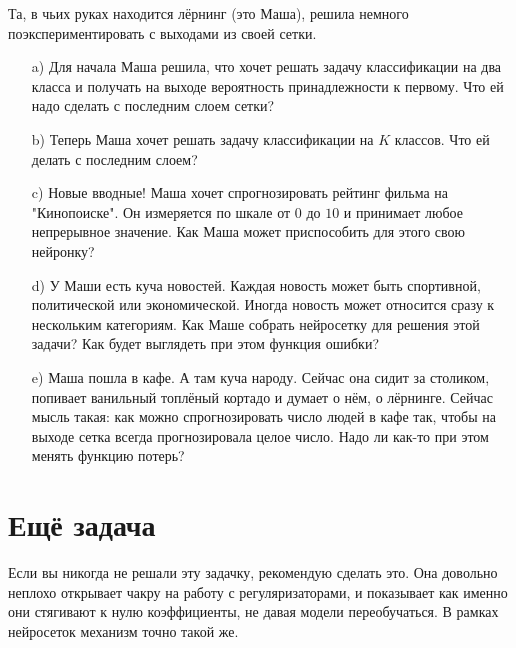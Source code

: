\documentclass[12pt, a4paper, oneside]{article}
\newcounter{problem}
\renewcommand{\theproblem}{\arabic{problem}}
\newcommand{\problemname}{Задача}
\newenvironment{problem}{
	\addtocounter{problem}{1}\noindent{ \color{myblue} \large\bfseries \problemname{} \theproblem \newline }
}{
	\par\bigskip
}
\begin{document}
\begin{problem}
	Та, в чьих руках находится лёрнинг (это Маша), решила немного поэкспериментировать с выходами из своей сетки. 
	\begin{itemize}
		\item[a)]  Для начала Маша решила, что хочет решать задачу классификации на два класса и получать на выходе вероятность принадлежности к первому. Что ей надо сделать с последним слоем сетки? 
		\item[b)]  Теперь Маша хочет решать задачу классификации на $K$ классов. Что ей делать с последним слоем? 
		\item[c)]  Новые вводные! Маша хочет спрогнозировать рейтинг фильма на "Кинопоиске". Он измеряется по шкале от $0$ до $10$ и принимает любое непрерывное значение. Как Маша может приспособить для этого свою нейронку? 
		\item[d)]  У Маши есть куча новостей. Каждая новость может быть спортивной, политической или экономической. Иногда новость может относится сразу к нескольким категориям. Как Маше собрать нейросетку для решения этой задачи?  Как будет выглядеть при этом функция ошибки? 
		\item[e)]  Маша пошла в кафе. А там куча народу. Сейчас она сидит за столиком, попивает ванильный топлёный кортадо и думает о нём, о лёрнинге.  Сейчас мысль такая: как можно спрогнозировать число людей в кафе так, чтобы на выходе сетка всегда прогнозировала целое число. Надо ли как-то при этом менять функцию потерь? 
	\end{itemize}
\end{problem}



\section*{Ещё задача}

Если вы никогда не решали эту задачку, рекомендую сделать это. Она довольно неплохо открывает чакру на работу с регуляризаторами, и показывает как именно они стягивают к нулю коэффициенты, не давая модели переобучаться. В рамках нейросеток механизм точно такой же. 
\end{document}
